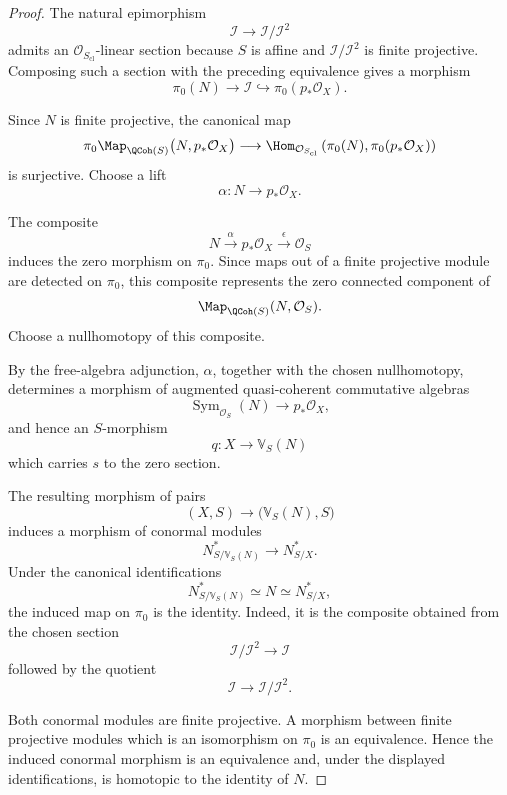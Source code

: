 \begin{proof}
The natural epimorphism
\[
    \mathcal I
    \longrightarrow
    \mathcal I/\mathcal I^2
\]
admits an
\(\mathcal O_{S_{\mathrm{cl}}}\)-linear section because \(S\) is affine
and \(\mathcal I/\mathcal I^2\) is finite projective. Composing such a
section with the preceding equivalence gives a morphism
\[
    \pi_0(N)
    \longrightarrow
    \mathcal I
    \hookrightarrow
    \pi_0(p_*\mathcal O_X).
\]

Since \(N\) is finite projective, the canonical map
\[
    \pi_0
    \Map_{\QCoh(S)}
    \bigl(
        N,
        p_*\mathcal O_X
    \bigr)
    \longrightarrow
    \Hom_{\mathcal O_{S_{\mathrm{cl}}}}
    \left(
        \pi_0(N),
        \pi_0(p_*\mathcal O_X)
    \right)
\]
is surjective. Choose a lift
\[
    \alpha
    \colon
    N
    \longrightarrow
    p_*\mathcal O_X.
\]

The composite
\[
    N
    \xrightarrow{\alpha}
    p_*\mathcal O_X
    \xrightarrow{\epsilon}
    \mathcal O_S
\]
induces the zero morphism on \(\pi_0\). Since maps out of a finite
projective module are detected on \(\pi_0\), this composite represents
the zero connected component of
\[
    \Map_{\QCoh(S)}(N,\mathcal O_S).
\]
Choose a nullhomotopy of this composite.

By the free-algebra adjunction, \(\alpha\), together with the chosen
nullhomotopy, determines a morphism of augmented quasi-coherent
commutative algebras
\[
    \operatorname{Sym}_{\mathcal O_S}(N)
    \longrightarrow
    p_*\mathcal O_X,
\]
and hence an \(S\)-morphism
\[
    q
    \colon
    X
    \longrightarrow
    \mathbb V_S(N)
\]
which carries \(s\) to the zero section.

The resulting morphism of pairs
\[
    (X,S)
    \longrightarrow
    \bigl(
        \mathbb V_S(N),S
    \bigr)
\]
induces a morphism of conormal modules
\[
    N^*_{S/\mathbb V_S(N)}
    \longrightarrow
    N^*_{S/X}.
\]
Under the canonical identifications
\[
    N^*_{S/\mathbb V_S(N)}
    \simeq
    N
    \simeq
    N^*_{S/X},
\]
the induced map on \(\pi_0\) is the identity. Indeed, it is the composite
obtained from the chosen section
\[
    \mathcal I/\mathcal I^2
    \longrightarrow
    \mathcal I
\]
followed by the quotient
\[
    \mathcal I
    \longrightarrow
    \mathcal I/\mathcal I^2.
\]

Both conormal modules are finite projective. A morphism between finite
projective modules which is an isomorphism on \(\pi_0\) is an
equivalence. Hence the induced conormal morphism is an equivalence and,
under the displayed identifications, is homotopic to the identity of
\(N\).


\end{proof}
